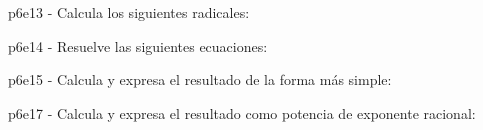 \documentclass[spanish, 11pt]{exam}
\begin{document}
    \begin{questions}
    \question p6e13 - Calcula los siguientes radicales:
        \begin{multicols}{3} 
        \end{multicols}
        \question p6e14 - Resuelve las siguientes ecuaciones:
        \begin{multicols}{3} 
        \end{multicols}
        \question p6e15 - Calcula y expresa el resultado de la forma más simple:
        \begin{multicols}{3} 
        \end{multicols}
        \question p6e17 - Calcula y expresa el resultado como potencia de exponente racional:
        \begin{multicols}{3} 
\end{multicols}
\end{questions}
\end{document}
